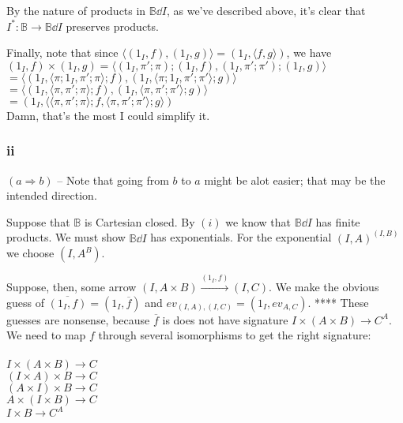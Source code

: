 \documentclass{article}
\begin{document}
By the nature of products in $\mathbb B \dd I$, as we've described above, 
it's clear that $I^* : \mathbb B \to \mathbb B \dd I$ preserves products.

Finally, note that since $\langle (1_I, f) , (1_I, g) \rangle = (1_I, \langle f,g \rangle)$,
we have \\
$(1_I, f) \times (1_I, g) = \langle (1_I,\pi';\pi);(1_I, f), (1_I,\pi';\pi');(1_I,g) \rangle$\\ 
$= \langle (1_I,\langle \pi;1_I, \pi';\pi \rangle;f), (1_I, \langle \pi;1_I, \pi';\pi' \rangle;g) \rangle$\\
$= \langle (1_I,\langle \pi, \pi';\pi \rangle;f), (1_I, \langle \pi, \pi';\pi' \rangle;g) \rangle$\\
$= (1_I, \langle \langle \pi, \pi';\pi \rangle;f, \langle \pi, \pi';\pi' \rangle;g \rangle)$\\
Damn, that's the most I could simplify it.

\subsubsection*{ii}

$(a \Rightarrow b)$ -- Note that going from $b$ to $a$ might be alot easier; that may be the intended direction.

Suppose that $\mathbb B$ is Cartesian closed. By $(i)$ we know that $\mathbb B \dd I$ has finite products.
We must show $\mathbb B \dd I$ has exponentials. For the exponential $(I,A)^{(I,B)}$ we choose $(I,A^B)$.

Suppose, then, some arrow $(I, A \times B) \overset{(1_I,f)}{\longrightarrow} (I,C)$.
We make the obvious guess of $\overline{(1_I,f)}=(1_I, \overline{f})$ and
$ev_{(I,A),(I,C)} = (1_I, ev_{A,C})$. **** These guesses are nonsense, because $\overline{f}$ is does
not have signature $I \times (A \times B) \to C^A$.
We need to map $f$ through several isomorphisms to get the right signature:\\~\\
$I \times (A \times B) \to C$\\
$(I \times A) \times B \to C$\\
$(A \times I) \times B \to C$\\
$A \times (I \times B) \to C$\\
$I \times B \to C^A$\\~\\
\end{document}
